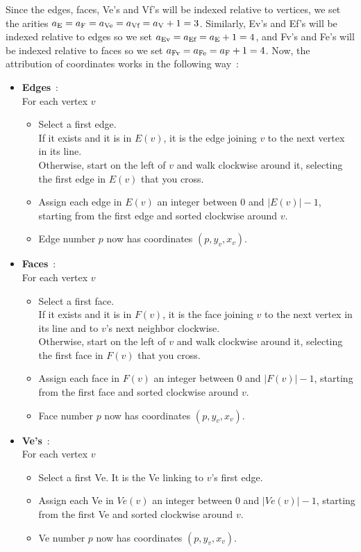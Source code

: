 \documentclass{report}
\begin{document}
Since the edges, faces, Ve's and Vf's will be indexed relative to vertices, we set the arities $a_\text E = a_\text F = a_\text{Ve} = a_\text{Vf} = a_\text V+1 = 3$. Similarly, Ev's and Ef's will be indexed relative to edges so we set $a_\text{Ev} = a_\text{Ef} = a_\text E+1 = 4$, and Fv's and Fe's will be indexed relative to faces so we set $a_\text{Fv} = a_\text{Fe} = a_\text F+1 = 4$. Now, the attribution of coordinates works in the following way~:
\begin{itemize}
	\item \textbf{Edges}~:\\
	For each vertex $v$
	\begin{itemize}[noitemsep, nosep, label=-]
		\item Select a first edge.\\
		If it exists and it is in $E(v)$, it is the edge joining $v$ to the next vertex in its line.\\
		Otherwise, start on the left of $v$ and walk clockwise around it, selecting the first edge in $E(v)$ that you cross.
		\item Assign each edge in $E(v)$ an integer between 0 and $|E(v)|-1$, starting from the first edge and sorted clockwise around $v$.
		\item Edge number $p$ now has coordinates $(p, y_v, x_v)$.
	\end{itemize}
	
	\item \textbf{Faces}~:\\
	For each vertex $v$
	\begin{itemize}[noitemsep, nosep, label=-]
		\item Select a first face.\\
		If it exists and it is in $F(v)$, it is the face joining $v$ to the next vertex in its line and to $v$'s next neighbor clockwise.\\
		Otherwise, start on the left of $v$ and walk clockwise around it, selecting the first face in $F(v)$ that you cross.
		\item Assign each face in $F(v)$ an integer between 0 and $|F(v)|-1$, starting from the first face and sorted clockwise around $v$.
		\item Face number $p$ now has coordinates $(p, y_v, x_v)$.
	\end{itemize}
	
	\item \textbf{Ve's}~:\\
	For each vertex $v$
	\begin{itemize}[noitemsep, nosep, label=-]
		\item Select a first Ve. It is the Ve linking to $v$'s first edge.
		\item Assign each Ve in $Ve(v)$ an integer between 0 and $|Ve(v)|-1$, starting from the first Ve and sorted clockwise around $v$.
		\item Ve number $p$ now has coordinates $(p, y_v, x_v)$.
	\end{itemize}
	

\end{itemize}
\end{document}
